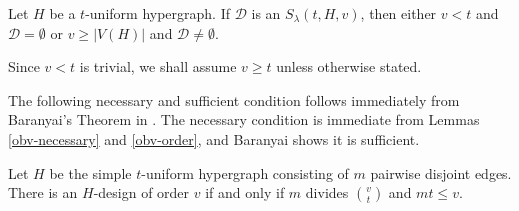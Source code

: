 \begin{lemma} \label{obv-order}
Let $H$ be a $t$-uniform hypergraph. If $\mathcal{D}$ is an $S_{\lambda}(t, H, v)$, then either $v < t$ and $\mathcal{D} = \emptyset$ or $v \geq |V(H)|$ and $\mathcal{D} \neq \emptyset$.
\end{lemma}

Since $v < t$ is trivial, we shall assume $v \geq t$ unless otherwise stated.

The following necessary and sufficient condition follows immediately from Baranyai's Theorem in \cite{baran}. The necessary condition is immediate from Lemmas \ref{obv-necessary} and \ref{obv-order}, and Baranyai shows it is sufficient.

\begin{theorem} \label{baranyai}
Let $H$ be the simple $t$-uniform hypergraph consisting of $m$ pairwise disjoint edges. There is an $H$-design of order $v$ if and only if $m$ divides ${v \choose t}$ and $mt \leq v$.
\end{theorem}
